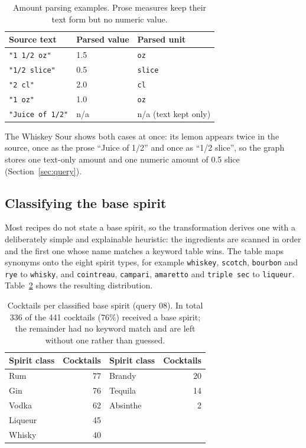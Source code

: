 \begin{table}[h]
  \centering
  \small
  \begin{tabular}{@{}lll@{}}
    \toprule
    Source text & Parsed value & Parsed unit \\
    \midrule
    \texttt{"1 1/2 oz"} & 1.5 & \texttt{oz} \\
    \texttt{"1/2 slice"} & 0.5 & \texttt{slice} \\
    \texttt{"2 cl"} & 2.0 & \texttt{cl} \\
    \texttt{"1 oz"} & 1.0 & \texttt{oz} \\
    \texttt{"Juice of 1/2"} & n/a & n/a (text kept only) \\
    \bottomrule
  \end{tabular}
  \caption{Amount parsing examples. Prose measures keep their text form but no
  numeric value.}
  \label{tab:amounts}
\end{table}

The Whiskey Sour shows both cases at once: its lemon appears twice in the
source, once as the prose ``Juice of 1/2'' and once as ``1/2 slice'', so the
graph stores one text-only amount and one numeric amount of 0.5 slice
(Section~\ref{sec:query}).

\subsection{Classifying the base spirit}

\label{sec:spirit-heuristic}
Most recipes do not state a base spirit, so the transformation derives one with
a deliberately simple and explainable heuristic: the ingredients are scanned in
order and the first one whose name matches a keyword table wins. The table maps
synonyms onto the eight spirit types, for example \texttt{whiskey},
\texttt{scotch}, \texttt{bourbon} and \texttt{rye} to \texttt{whisky}, and
\texttt{cointreau}, \texttt{campari}, \texttt{amaretto} and \texttt{triple sec}
to \texttt{liqueur}. Table~\ref{tab:spirits} shows the resulting distribution.

\begin{table}[h]
  \centering
  \small
  \begin{tabular}{@{}lrlr@{}}
    \toprule
    Spirit class & Cocktails & Spirit class & Cocktails \\
    \midrule
    Rum & 77 & Brandy & 20 \\
    Gin & 76 & Tequila & 14 \\
    Vodka & 62 & Absinthe & 2 \\
    Liqueur & 45 & & \\
    Whisky & 40 & & \\
    \bottomrule
  \end{tabular}
  \caption{Cocktails per classified base spirit (query 08). In total 336 of the
  441 cocktails (76\%) received a base spirit; the remainder had no keyword
  match and are left without one rather than guessed.}
  \label{tab:spirits}
\end{table}

